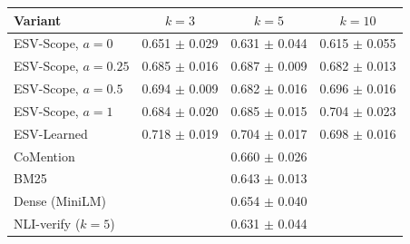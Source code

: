\setlength{\tabcolsep}{3pt}
\begin{tabular}{lccc}
\toprule
Variant & $k=3$ & $k=5$ & $k=10$ \\
\midrule
ESV-Scope, $a=0$ & 0.651 $\pm$ 0.029 & 0.631 $\pm$ 0.044 & 0.615 $\pm$ 0.055 \\
ESV-Scope, $a=0.25$ & 0.685 $\pm$ 0.016 & 0.687 $\pm$ 0.009 & 0.682 $\pm$ 0.013 \\
ESV-Scope, $a=0.5$ & 0.694 $\pm$ 0.009 & 0.682 $\pm$ 0.016 & 0.696 $\pm$ 0.016 \\
ESV-Scope, $a=1$ & 0.684 $\pm$ 0.020 & 0.685 $\pm$ 0.015 & 0.704 $\pm$ 0.023 \\
ESV-Learned & 0.718 $\pm$ 0.019 & 0.704 $\pm$ 0.017 & 0.698 $\pm$ 0.016 \\
\midrule
CoMention & \multicolumn{3}{c}{0.660 $\pm$ 0.026} \\
BM25 & \multicolumn{3}{c}{0.643 $\pm$ 0.013} \\
Dense (MiniLM) & \multicolumn{3}{c}{0.654 $\pm$ 0.040} \\
NLI-verify ($k=5$) & \multicolumn{3}{c}{0.631 $\pm$ 0.044} \\
\bottomrule
\end{tabular}

